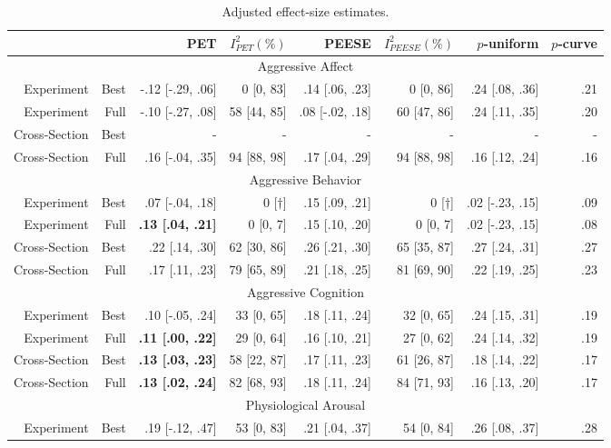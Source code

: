 \documentclass[man]{apa6}
\begin{document}
\begin{table}[htbp]
	\small
	\centering
	\caption{Adjusted effect-size estimates.}
	\begin{tabular}{rrrrrrrr}
		\toprule
		&       & PET   & $I^2_{PET} (\%)$ & PEESE & $I^2_{PEESE} (\%)$ & $p$-uniform & $p$-curve \\
		\midrule
		\multicolumn{8}{c}{Aggressive Affect} \\
		Experiment & Best  & -.12 [-.29, .06] & 0 [0, 83] & .14 [.06, .23] &  0 [0, 86] & .24 [.08, .36] & .21 \\
		Experiment & Full  & -.10 [-.27, .08] & 58 [44, 85] & .08 [-.02, .18] & 60 [47, 86] & .24 [.11, .35] & .20 \\
		Cross-Section & Best  & -     & -     & -     & -     & -     & - \\
		Cross-Section & Full  &  .16 [-.04, .35] & 94 [88, 98] & .17 [.04, .29] & 94 [88, 98] & .16 [.12, .24] & .16 \\
		\multicolumn{8}{c}{Aggressive Behavior} \\
		Experiment & Best  &  .07 [-.04, .18] &  0 [$\dagger$] & .15 [.09, .21] &  0 [$\dagger$] & .02 [-.23, .15] & .09 \\
		Experiment & Full  &  \textbf{.13 [.04, .21]} & 0 [0, 7] & .15 [.10, .20] & 0 [0, 7] & .02 [-.23, .15] & .08 \\
		Cross-Section & Best  &  .22 [.14, .30] & 62 [30, 86] & .26 [.21, .30] & 65 [35, 87] & .27 [.24, .31] & .27 \\
		Cross-Section & Full  &  .17 [.11, .23] & 79 [65, 89] & .21 [.18, .25] & 81 [69, 90] & .22 [.19, .25] & .23 \\
		\multicolumn{8}{c}{Aggressive Cognition} \\
		Experiment & Best  &  .10 [-.05, .24] & 33 [0, 65] & .18 [.11, .24] & 32 [0, 65] & .24 [.15, .31] & .19 \\
		Experiment & Full  &  \textbf{.11 [.00, .22]} & 29 [0, 64] & .16 [.10, .21] & 27 [0, 62] & .24 [.14, .32] & .19 \\
		Cross-Section & Best  &  \textbf{.13 [.03, .23]} & 58 [22, 87] & .17 [.11, .23] & 61 [26, 87] & .18 [.14, .22] & .17 \\
		Cross-Section & Full  &  \textbf{.13 [.02, .24]} & 82 [68, 93] & .18 [.11, .24] & 84 [71, 93] & .16 [.13, .20] & .17 \\
		\multicolumn{8}{c}{Physiological Arousal} \\
		Experiment & Best  &  .19 [-.12, .47] & 53 [0, 83] & .21 [.04, .37] & 54 [0, 84] & .26 [.08, .37] & .28 \\

\end{tabular}
\end{table}
\end{document}
